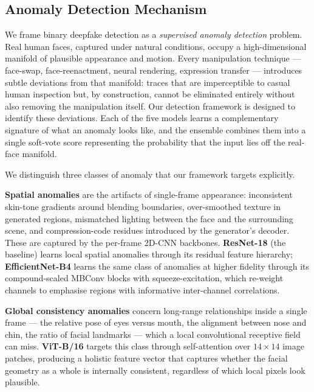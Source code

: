 
\subsection{Anomaly Detection Mechanism}
\label{sec:anomaly}

We frame binary deepfake detection as a \textit{supervised anomaly detection} problem. Real human faces, captured under natural conditions, occupy a high-dimensional manifold of plausible appearance and motion. Every manipulation technique — face-swap, face-reenactment, neural rendering, expression transfer — introduces subtle deviations from that manifold: traces that are imperceptible to casual human inspection but, by construction, cannot be eliminated entirely without also removing the manipulation itself. Our detection framework is designed to identify these deviations. Each of the five models learns a complementary signature of what an anomaly looks like, and the ensemble combines them into a single soft-vote score representing the probability that the input lies off the real-face manifold.

We distinguish three classes of anomaly that our framework targets explicitly.

\textbf{Spatial anomalies} are the artifacts of single-frame appearance: inconsistent skin-tone gradients around blending boundaries, over-smoothed texture in generated regions, mismatched lighting between the face and the surrounding scene, and compression-code residues introduced by the generator's decoder. These are captured by the per-frame 2D-CNN backbones. \textbf{ResNet-18} (the baseline) learns local spatial anomalies through its residual feature hierarchy; \textbf{EfficientNet-B4} learns the same class of anomalies at higher fidelity through its compound-scaled MBConv blocks with squeeze-excitation, which re-weight channels to emphasise regions with informative inter-channel correlations.

\textbf{Global consistency anomalies} concern long-range relationships inside a single frame — the relative pose of eyes versus mouth, the alignment between nose and chin, the ratio of facial landmarks — which a local convolutional receptive field can miss. \textbf{ViT-B/16} targets this class through self-attention over $14 \times 14$ image patches, producing a holistic feature vector that captures whether the facial geometry as a whole is internally consistent, regardless of which local pixels look plausible.

